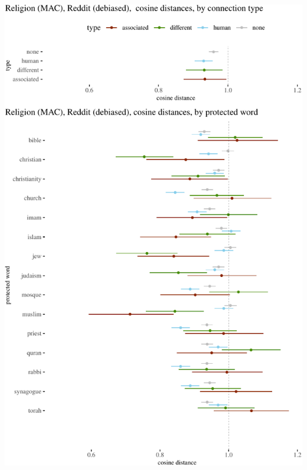 \documentclass{clv3}
\begin{document}
\begin{center}\includegraphics[width=1\linewidth]{figures/resultsDebiasedReligionReddita} \end{center}
\end{document}
